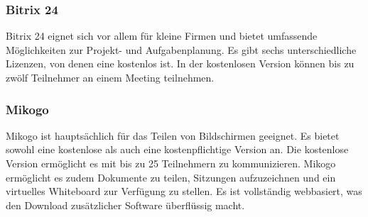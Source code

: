\subsubsection{Bitrix 24}
Bitrix 24 eignet sich vor allem für kleine Firmen und bietet umfassende Möglichkeiten zur Projekt- und Aufgabenplanung.
Es gibt sechs unterschiedliche Lizenzen, von denen eine kostenlos ist.
In der kostenlosen Version können bis zu zwölf Teilnehmer an einem Meeting teilnehmen.
\autocite[Vgl.][]{M_Straub.o.J.}

\subsubsection{Mikogo}
Mikogo ist hauptsächlich für das Teilen von Bildschirmen geeignet.
Es bietet sowohl eine kostenlose als auch eine kostenpflichtige Version an.
Die kostenlose Version ermöglicht es mit bis zu 25 Teilnehmern zu kommunizieren.
Mikogo ermöglicht es zudem Dokumente zu teilen, Sitzungen aufzuzeichnen und ein virtuelles Whiteboard zur Verfügung zu stellen.
Es ist vollständig webbasiert, was den Download zusätzlicher Software überflüssig macht.
\autocite[Vgl.][]{M_Straub.o.J.}

